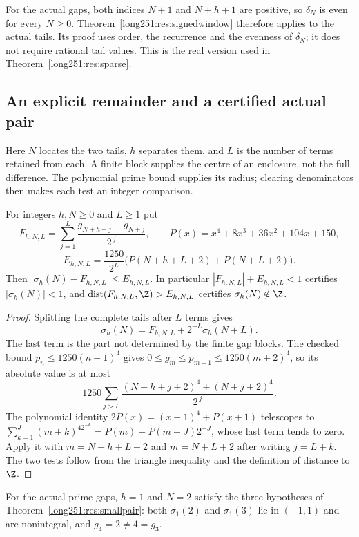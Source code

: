 For the actual gaps, both indices $N+1$ and $N+h+1$ are positive, so
$\delta_N$ is even for every $N\ge0$.
Theorem~\ref{long251:res:signedwindow} therefore applies to the actual
tails.  Its proof uses order, the recurrence and the evenness of
$\delta_N$; it does not require rational tail values.  This is the real
version used in Theorem~\ref{long251:res:sparse}.

\subsection{An explicit remainder and a certified actual pair}

Here $N$ locates the two tails, $h$ separates them, and $L$ is the
number of terms retained from each.  A finite block supplies the centre
of an enclosure, not the full difference.  The polynomial prime bound
supplies its radius; clearing denominators then makes each test an
integer comparison.

\begin{proposition}\label{long251:res:explicit-remainder}
For integers $h,N\ge0$ and $L\ge1$ put
\[
 F_{h,N,L}=\sum_{j=1}^{L}\frac{g_{N+h+j}-g_{N+j}}{2^{\,j}},\qquad
 P(x)=x^4+8x^3+36x^2+104x+150,
\]
\[
 E_{h,N,L}=\frac{1250}{2^{L}}\bigl(P(N+h+L+2)+P(N+L+2)\bigr).
\]
Then $\bigl|\sigma_h(N)-F_{h,N,L}\bigr|\le E_{h,N,L}$.  In particular
$|F_{h,N,L}|+E_{h,N,L}<1$ certifies $|\sigma_h(N)|<1$, and
$\operatorname{dist}(F_{h,N,L},\Z)>E_{h,N,L}$ certifies
$\sigma_h(N)\notin\Z$.
\end{proposition}

\begin{proof}
Splitting the complete tails after $L$ terms gives
\[
 \sigma_h(N)=F_{h,N,L}+2^{-L}\sigma_h(N+L).
\]
The last term is the part not determined by the finite gap blocks.
The checked bound $p_n\le1250(n+1)^4$ gives $0\le g_m\le p_{m+1}\le1250(m+2)^4$,
so its absolute value is at most
\[
 1250\sum_{j>L}\frac{(N+h+j+2)^4+(N+j+2)^4}{2^{\,j}} .
\]
The polynomial identity $2P(x)=(x+1)^4+P(x+1)$ telescopes to
$\sum_{k=1}^{J}(m+k)^42^{-k}=P(m)-P(m+J)2^{-J}$, whose last term tends to zero.
Apply it with $m=N+h+L+2$ and $m=N+L+2$ after writing $j=L+k$.  The two tests
follow from the triangle inequality and the definition of distance to $\Z$.
\end{proof}

\begin{proposition}\label{long251:res:finite-smallpair}
For the actual prime gaps, $h=1$ and $N=2$ satisfy the three hypotheses of
Theorem~\ref{long251:res:smallpair}: both $\sigma_1(2)$ and $\sigma_1(3)$ lie in
$(-1,1)$ and are nonintegral, and $g_4=2\ne4=g_3$.
\end{proposition}

